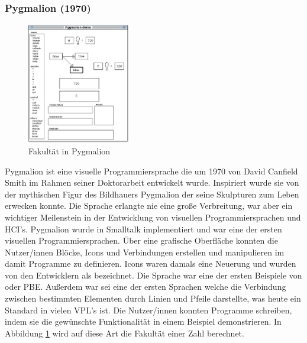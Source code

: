 \documentclass[ngerman]{article}
\begin{document}
\subsubsection{Pygmalion (1970)}
\begingroup
\setlength\intextsep{2pt}
\begin{minipage}{\linewidth}
\begin{figure}
  \centering
  \includegraphics[width=0.4\textwidth]{./graphics/pygmalion.jpg}
  \caption{Fakultät in Pygmalion \cite{smith1975pygmalion}}
  \label{fig:pygmalion_demo}
\end{figure}

Pygmalion ist eine visuelle Programmiersprache die um 1970 von David Canfield Smith im Rahmen seiner Doktorarbeit entwickelt wurde. Inspiriert wurde sie von der mythischen Figur des Bildhauers Pygmalion der seine Skulpturen zum Leben erwecken konnte.
Die Sprache erlangte nie eine große Verbreitung, war aber ein wichtiger Meilenstein in der Entwicklung von visuellen Programmiersprachen und HCI's.
Pygmalion wurde in Smalltalk implementiert und war eine der ersten visuellen Programmiersprachen. Über eine grafische Oberfläche konnten die Nutzer/innen Blöcke, Icons und Verbindungen erstellen und manipulieren im damit Programme zu definieren.
  Icons waren damals eine Neuerung und wurden von den Entwicklern als  bezeichnet. 
  Die Sprache war eine der ersten Beispiele von  oder PBE. Außerdem war sei eine der ersten Sprachen welche die Verbindung zwischen bestimmten Elementen durch Linien und Pfeile darstellte, was heute ein Standard in vielen VPL's ist.
Die Nutzer/innen konnten Programme schreiben, indem sie die gewünschte Funktionalität in einem Beispiel demonstrieren. 
In Abbildung \ref{fig:pygmalion_demo} wird auf diese Art die Fakultät einer Zahl berechnet. 

\end{minipage}
\endgroup
\end{document}
